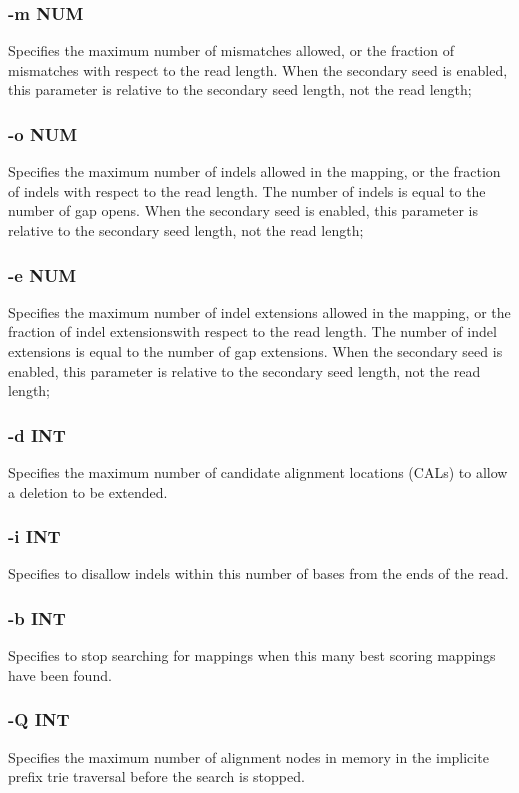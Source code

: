 \documentclass[a4paper,12pt]{book}
\begin{document}
\subsubsection{-m NUM}
Specifies the maximum number of mismatches allowed, or the fraction of mismatches with respect to the read length.
When the secondary seed is enabled, this parameter is relative to the secondary seed length, not the read length;

\subsubsection{-o NUM}
Specifies the maximum number of indels allowed in the mapping, or the fraction of indels with respect to the read length.
The number of indels is equal to the number of gap opens.
When the secondary seed is enabled, this parameter is relative to the secondary seed length, not the read length;

\subsubsection{-e NUM}
Specifies the maximum number of indel extensions allowed in the mapping, or the fraction of indel extensionswith respect to the read length.
The number of indel extensions is equal to the number of gap extensions.
When the secondary seed is enabled, this parameter is relative to the secondary seed length, not the read length;

\subsubsection{-d INT}
Specifies the maximum number of candidate alignment locations (CALs) to allow a deletion to be extended.

\subsubsection{-i INT}
Specifies to disallow indels within this number of bases from the ends of the read.

\subsubsection{-b INT}
Specifies to stop searching for mappings when this many best scoring mappings have been found.

\subsubsection{-Q INT}
Specifies the maximum number of alignment nodes in memory in the implicite prefix trie traversal before the search is stopped.
\end{document}
